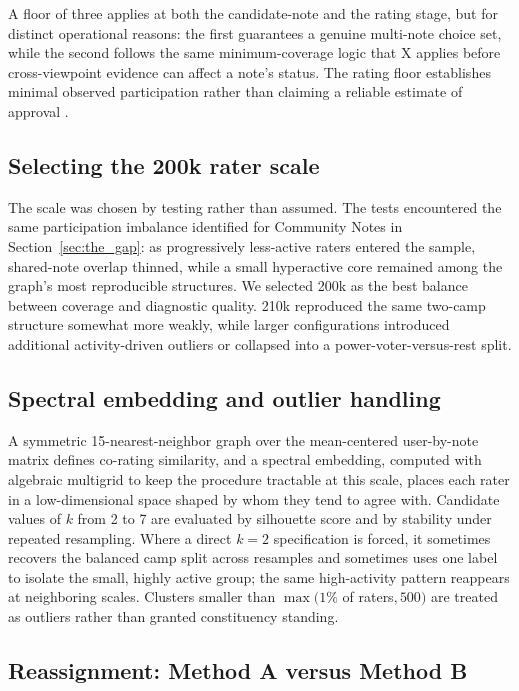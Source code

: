 \documentclass[10pt,twocolumn]{article}
\begin{document}
A floor of three applies at both the candidate-note and the rating stage, but
for distinct operational reasons: the first guarantees a genuine multi-note
choice set, while the second follows the same minimum-coverage logic that X
applies before cross-viewpoint evidence can affect a note's status. The rating
floor establishes minimal observed participation rather than claiming a
reliable estimate of approval \citep{xcommunitynotes2026ranking}.

\subsection{Selecting the 200k rater scale}
\label{app:scale-selection}

The scale was chosen by testing rather than assumed. The tests encountered the
same participation imbalance identified for Community Notes in
Section~\ref{sec:the_gap}: as progressively less-active raters entered the
sample, shared-note overlap thinned, while a small hyperactive core remained
among the graph's most reproducible structures. We selected 200k as the best
balance between coverage and diagnostic quality. 210k reproduced the same
two-camp structure somewhat more weakly, while larger configurations
introduced additional activity-driven outliers or collapsed into a
power-voter-versus-rest split.

\subsection{Spectral embedding and outlier handling}
\label{app:spectral}

A symmetric 15-nearest-neighbor graph over the mean-centered user-by-note
matrix defines co-rating similarity, and a spectral embedding, computed with
algebraic multigrid to keep the procedure tractable at this scale, places each
rater in a low-dimensional space shaped by whom they tend to agree with.
Candidate values of $k$ from 2 to 7 are evaluated by silhouette score and by
stability under repeated resampling. Where a direct $k=2$ specification is
forced, it sometimes recovers the balanced camp split across resamples and
sometimes uses one label to isolate the small, highly active group; the same
high-activity pattern reappears at neighboring scales. Clusters smaller than
$\max(1\%$ of raters$, 500)$ are treated as outliers rather than granted
constituency standing.

\subsection{Reassignment: Method A versus Method B}
\label{app:methods-ab}
\end{document}
